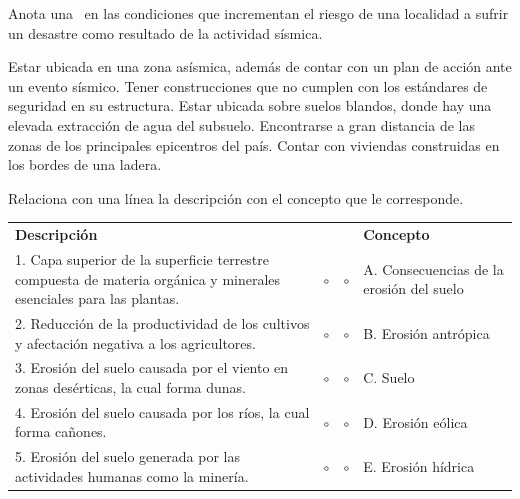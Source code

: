 \documentclass[11pt, a4paper, answers]{exam}
\begin{document}
\begin{questions}
\question Anota una \checkmark\ en las condiciones que incrementan el riesgo de una localidad a sufrir un desastre como resultado de la actividad sísmica.
\begin{checkboxes}
    \choice Estar ubicada en una zona asísmica, además de contar con un plan de acción ante un evento sísmico.
    \CorrectChoice Tener construcciones que no cumplen con los estándares de seguridad en su estructura.
    \CorrectChoice Estar ubicada sobre suelos blandos, donde hay una elevada extracción de agua del subsuelo.
    \choice Encontrarse a gran distancia de las zonas de los principales epicentros del país.
    \CorrectChoice Contar con viviendas construidas en los bordes de una ladera.
\end{checkboxes}
\vspace{0.5cm}

\question Relaciona con una línea la descripción con el concepto que le corresponde.
\begin{center}
\renewcommand{\arraystretch}{1.5}
\begin{tabular}{p{10cm} c c p{4cm}}
\textbf{Descripción} & & & \textbf{Concepto} \\
1. Capa superior de la superficie terrestre compuesta de materia orgánica y minerales esenciales para las plantas. & $\circ$ & $\circ$ & A. Consecuencias de la erosión del suelo \\
2. Reducción de la productividad de los cultivos y afectación negativa a los agricultores. & $\circ$ & $\circ$ & B. Erosión antrópica \\
3. Erosión del suelo causada por el viento en zonas desérticas, la cual forma dunas. & $\circ$ & $\circ$ & C. Suelo \\
4. Erosión del suelo causada por los ríos, la cual forma cañones. & $\circ$ & $\circ$ & D. Erosión eólica \\
5. Erosión del suelo generada por las actividades humanas como la minería. & $\circ$ & $\circ$ & E. Erosión hídrica \\
\end{tabular}
\end{center}
\vspace{0.5cm}


\end{questions}
\end{document}
